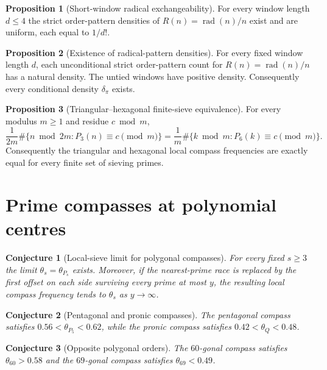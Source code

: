 \documentclass[11pt]{article}
\newtheorem{conjecture}{Conjecture}
\theoremstyle{definition}
\newtheorem{proposition}{Proposition}
\begin{document}
\begin{proposition}[Short-window radical exchangeability]\label{w:radunif}
For every window length $d\le4$ the strict order-pattern densities of $R(n)=\operatorname{rad}(n)/n$ exist and are uniform, each equal to $1/d!$.
\end{proposition}

\begin{proposition}[Existence of radical-pattern densities]\label{w:raddens}
For every fixed window length $d$, each unconditional strict order-pattern count for $R(n)=\operatorname{rad}(n)/n$ has a natural density.  The untied windows have positive density.  Consequently every conditional density $\delta_\pi$ exists.
\end{proposition}

\begin{proposition}[Triangular--hexagonal finite-sieve equivalence]\label{w:trihex}
For every modulus $m\ge1$ and residue $c\bmod m$,
\[
\frac{1}{2m}\#\{n\bmod 2m:P_3(n)\equiv c\pmod m\}
=\frac{1}{m}\#\{k\bmod m:P_6(k)\equiv c\pmod m\}.
\]
Consequently the triangular and hexagonal local compass frequencies are exactly equal for every finite set of sieving primes.
\end{proposition}

\section{Prime compasses at polynomial centres}

\begin{conjecture}[Local-sieve limit for polygonal compasses]\label{w1}
For every fixed $s\ge3$ the limit $\theta_s=\theta_{P_s}$ exists.  Moreover, if the nearest-prime race is replaced by the first offset on each side surviving every prime at most $y$, the resulting local compass frequency tends to $\theta_s$ as $y\to\infty$.
\end{conjecture}

\begin{conjecture}[Pentagonal and pronic compasses]\label{w2}
The pentagonal compass satisfies $0.56<\theta_{P_5}<0.62$, while the pronic compass satisfies $0.42<\theta_Q<0.48$.
\end{conjecture}

\begin{conjecture}[Opposite polygonal orders]\label{w3}
The $60$-gonal compass satisfies $\theta_{60}>0.58$ and the $69$-gonal compass satisfies $\theta_{69}<0.49$.
\end{conjecture}
\end{document}
